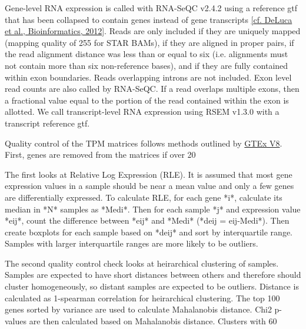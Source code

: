 \documentclass[12pt]{article}
\begin{document}
Gene-level RNA expression is called with RNA-SeQC v2.4.2 using a reference gtf that has been collapsed to contain genes instead of gene transcripts \href{https://doi.org/10.1093/bioinformatics/bts196}{[cf. DeLuca et al., Bioinformatics, 2012}]. Reads are only included if they are uniquely mapped (mapping quality of 255 for STAR BAMs), if they are aligned in proper pairs, if the read alignment distance was less than or equal to six (i.e. alignments must not contain more than six non-reference bases), and if they are fully contained within exon boundaries. Reads overlapping introns are not included. Exon level read counts are also called by RNA-SeQC. If a read overlaps multiple exons, then a fractional value equal to the portion of the read contained within the exon is allotted. We call transcript-level RNA expression using RSEM v1.3.0 with a transcript reference gtf.

Quality control of the TPM matrices follows methods outlined by \href{https://gtexportal.org/home/aboutGTEx#staticTextAnalysisMethods}{GTEx V8}. First, genes are removed from the matrices if over 20%



The first looks at Relative Log Expression (RLE). It is assumed that most gene expression values in a sample should be near a mean value and only a few genes are differentially expressed. To calculate RLE, for each gene *i*, calculate its median in *N* samples as *Medi*. Then for each sample *j* and expression value *eij*, count the difference between *eij* and *Medi* (*deij = eij-Medi*). Then create boxplots for each sample based on *deij* and sort by interquartile range. Samples with larger interquartile ranges are more likely to be outliers.



The second quality control check looks at heirarchical clustering of samples. Samples are expected to have short distances between others and therefore should cluster homogeneously, so distant samples are expected to be outliers. Distance is calculated as 1-spearman correlation for heirarchical clustering. The top 100 genes sorted by variance are used to calculate Mahalanobis distance. Chi2 p-values are then calculated based on Mahalanobis distance. Clusters with 60%
\end{document}
